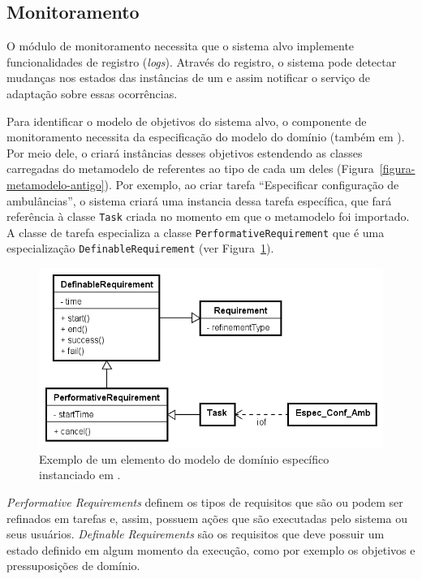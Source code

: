 \subsection{Monitoramento}
\label{sec-referencial-zanshin-monitoramento}

O módulo de monitoramento necessita que o sistema alvo implemente funcionalidades de registro (\textit{logs}). Através do registro, o sistema pode detectar mudanças nos estados das instâncias de um \awreq e assim notificar o serviço de adaptação sobre essas ocorrências. 

Para identificar o modelo de objetivos do sistema alvo, o componente de monitoramento necessita da especificação do modelo do domínio (também em \ecore). Por meio dele, o \zanshin criará instâncias desses objetivos estendendo as classes carregadas do metamodelo de \gore referentes ao tipo de cada um deles (Figura~\ref{figura-metamodelo-antigo}). Por exemplo, ao criar tarefa ``Especificar configuração de ambulâncias'', o sistema criará uma instancia dessa tarefa específica, que fará referência à classe \texttt{Task} criada no momento em que o metamodelo foi importado. A classe de tarefa especializa a classe \texttt{PerformativeRequirement} que é uma especialização \texttt{DefinableRequirement} (ver Figura~\ref{exemplo-instanciacao-ecore}). 

\begin{figure}
	\centering
	\includegraphics[width=1\textwidth]{figuras/exemplos-emf/exemplo-instanciacao-ecore.PNG}
	\caption{Exemplo de um elemento do modelo de domínio específico instanciado em \zanshin.}
	\label{exemplo-instanciacao-ecore}
\end{figure}

\textit{Performative Requirements} definem os tipos de requisitos que são ou podem ser refinados em tarefas e, assim, possuem ações que são executadas pelo sistema ou seus usuários. \textit{Definable Requirements} são os requisitos que deve possuir um estado definido em algum momento da execução, como por exemplo os objetivos e pressuposições de domínio.

